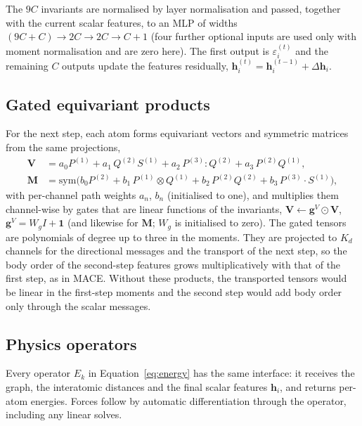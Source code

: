 \documentclass[journal=jctcce,manuscript=article,layout=traditional]{achemso}
\newcommand{\vect}[1]{\bm{#1}}
\begin{document}
The $9C$ invariants are normalised by layer normalisation\cite{ba2016layernorm} and passed, together with the
current scalar features, to an MLP of widths $(9C+C)\to2C\to2C\to C+1$ (four further optional inputs are used only
with moment normalisation and are zero here). The first output is $\varepsilon_i^{(t)}$ and the remaining $C$
outputs update the features residually, $\vect h^{(t)}_i=\vect h^{(t-1)}_i+\Delta\vect h_i$.

\subsection{Gated equivariant products}
\label{sec:gated}
For the next step, each atom forms equivariant vectors and symmetric matrices from the same projections,
\begin{align}
\vect V&=a_0P^{(1)}+a_1\,Q^{(2)}S^{(1)}+a_2\,P^{(3)}\!:\!Q^{(2)}+a_3\,P^{(2)}Q^{(1)},\nonumber\\
\vect M&=\mathrm{sym}\big(b_0P^{(2)}+b_1\,P^{(1)}\!\otimes Q^{(1)}+b_2\,P^{(2)}Q^{(2)}+b_3\,P^{(3)}\!\cdot S^{(1)}\big),
\label{eq:gated}
\end{align}
with per-channel path weights $a_n$, $b_n$ (initialised to one), and multiplies them channel-wise by gates that are
linear functions of the invariants, $\vect V\leftarrow\vect g^V\odot\vect V$, $\vect g^V=W_gI+\vect 1$ (and
likewise for $\vect M$; $W_g$ is initialised to zero). The gated tensors are polynomials of degree up to three in
the moments. They are projected to $K_d$ channels for the directional messages and the transport of the next step,
so the body order of the second-step features grows multiplicatively with that of the first step, as in MACE.
Without these products, the transported tensors would be linear in the first-step moments and the second step would
add body order only through the scalar messages.

\subsection{Physics operators}
\label{sec:physops}
Every operator $E_k$ in Equation~\ref{eq:energy} has the same interface: it receives the graph, the interatomic
distances and the final scalar features $\vect h_i$, and returns per-atom energies. Forces follow by automatic
differentiation through the operator, including any linear solves.
\end{document}
